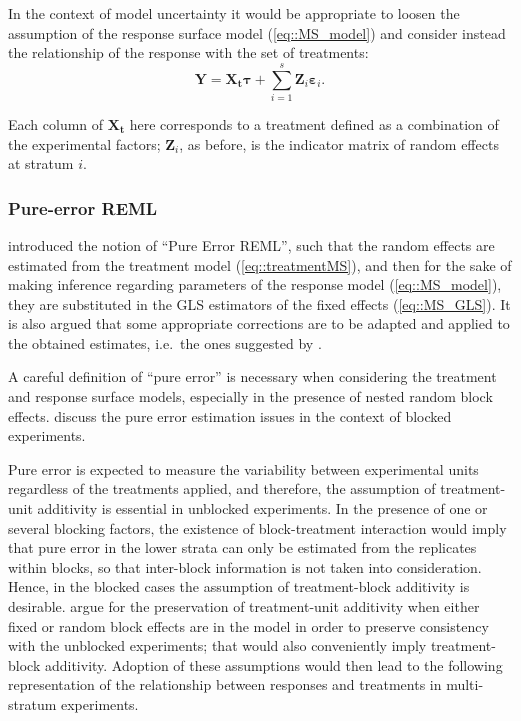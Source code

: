 In the context of model uncertainty it would be appropriate to loosen the assumption of the response surface model (\ref{eq::MS_model}) and consider instead the relationship of the response with the set of treatments:
\begin{equation}
\label{eq::treatmentMS}
\bm{Y}=\bm{X_t}\bm{\tau}+\sum_{i=1}^{s}\bm{Z}_{i}\bm{\varepsilon}_{i}.
\end{equation}

Each column of $\bm{X_t}$ here corresponds to a treatment defined as a combination of the experimental factors;
$\bm{Z}_{i}$, as before, is the indicator matrix of random effects at stratum $i$.

\subsubsection{Pure-error REML}
\cite{GilmourGoos2016PEREML} introduced the notion of ``Pure Error REML'', such that the random effects are estimated from the treatment model (\ref{eq::treatmentMS}), and then for the sake of making inference regarding parameters of the response model (\ref{eq::MS_model}), they are substituted in the GLS estimators of the fixed effects (\ref{eq::MS_GLS}). It is also argued that some appropriate corrections are to be adapted and applied to the obtained estimates, i.e.~the ones suggested by \cite{kenward1997small}. 

A careful definition of ``pure error'' is necessary when considering the treatment and response surface models, especially in the presence of nested random block effects. \cite{Gilmour2000PErsm} discuss the pure error estimation issues in the context of blocked experiments. 

Pure error is expected to measure the variability between experimental units regardless of the treatments applied, and therefore, the assumption of treatment-unit additivity is essential in unblocked experiments.  In the presence of one or several blocking factors, the existence of block-treatment interaction would imply that pure error in the lower strata can only be estimated from the replicates within blocks, so that inter-block information is not taken into consideration. Hence, in the blocked cases the assumption of treatment-block additivity \citep{Draper1998} is desirable. \cite{Gilmour2000PErsm} argue for the preservation of treatment-unit additivity when either fixed or random block effects are in the model in order to preserve consistency with the unblocked experiments; that would also conveniently imply treatment-block additivity. Adoption of these assumptions would then lead to the following representation of the relationship between responses and treatments in multi-stratum experiments. 

